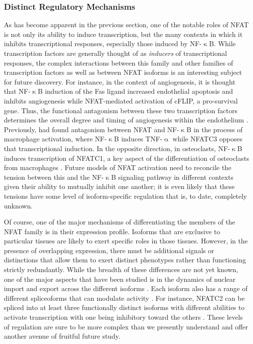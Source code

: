 \subsubsection{Distinct Regulatory Mechanisms}\label{nfatreg}

As has become apparent in the previous section, one of the notable roles of NFAT is not only its ability to induce transcription, but the many contexts in which it inhibits transcriptional responses, especially those induced by NF\hyp{}$\upkappa$B. While transcription factors are generally thought of as \textit{inducers} of transcriptional responses, the complex interactions between this family and other families of transcription factors as well as between NFAT isoforms is an interesting subject for future discovery. For instance, in the context of angiogenesis, it is thought that NF\hyp{}$\upkappa$B induction of the Fas ligand increased endothelial apoptosis and inhibits angiogenesis while NFAT\hyp{}mediated activation of cFLIP, a pro\hyp{}survival gene. Thus, the functional antagonism between these two transcription factors determines the overall degree and timing of angiogenesis within the endothelium \citep{Aurora2010}. Previously, \citet{Conboy1999} had found antagonism between NFAT and NF\hyp{}$\upkappa$B in the process of macrophage activation, where NF\hyp{}$\upkappa$B induces TNF\hyp{}$\upalpha$ while NFATC3 opposes that transcriptional induction. In the opposite direction, in osteoclasts, NF\hyp{}$\upkappa$B induces transcription of NFATC1, a key aspect of the differentiation of osteoclasts from macrophages \citep{Asagiri2005}. Future models of NFAT activation need to reconcile the tension between this and the NF\hyp{}$\upkappa$B signaling pathway in different contexts given their ability to mutually inhibit one another; it is even likely that these tensions have some level of isoform\hyp{}specific regulation that is, to date, completely unknown. 

Of course, one of the major mechanisms of differentiating the members of the NFAT family is in their expression profile. Isoforms that are exclusive to particular tissues are likely to exert specific roles in those tissues. However, in the presence of overlapping expression, there must be additional signals or distinctions that allow them to exert distinct phenotypes rather than functioning strictly redundantly. While the breadth of these differences are not yet known, one of the major aspects that have been studied is in the dynamics of nuclear import and export across the different isoforms \citep{Chow1997, Yissachar2013, Kar2015, Kar2016}. Each isoform also has a range of different spliceoforms that can modulate activity \citep{Vihma2008, Mancini2009}. For instance, NFATC2 can be spliced into at least three functionally distinct isoforms with different abilities to activate transcription with one being inhibitory toward the others \citep{Chuvpilo1999}. These levels of regulation are sure to be more complex than we presently understand and offer another avenue of fruitful future study.

